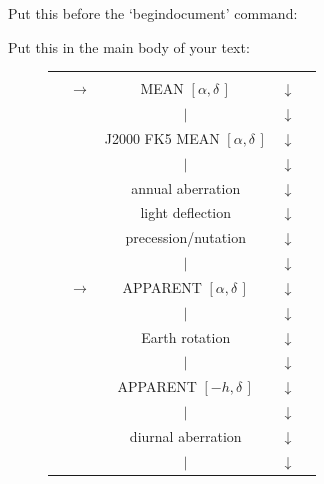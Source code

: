 \documentclass[twoside,11pt]{starlink}
\providecommand{\radec}{$[\alpha,\delta\,]$}
\providecommand{\mhadec}{$[-h,\delta\,]$}
\providecommand{\azel}{$[A,E\,]$}
\begin{document}
\scriptsize
\begin{terminalv}
        Put this before the `begin{document}' command:
\providecommand {\radec}   {$[\alpha,\delta\,]$}
\providecommand {\mhadec}  {$[-h,\delta\,]$}
\providecommand {\azel}    {$[A,E\,]$}

        Put this in the main body of your text:
\begin{figure}
  \begin{small}
    \begin{center}
      \begin{tabular}{|ccccc|}   \hline
        &                 &                                &                & \\
        & $\rightarrow$   &         MEAN \radec            &  $\downarrow$  & \\
        &                 &             $|$                &  $\downarrow$  & \\
        &                 &     J2000 FK5 MEAN \radec      &  $\downarrow$  & \\
        &                 &             $|$                &  $\downarrow$  & \\
        &                 &       annual aberration        &  $\downarrow$  & \\
        &                 &        light deflection        &  $\downarrow$  & \\
        &                 &      precession/nutation       &  $\downarrow$  & \\
        &                 &             $|$                &  $\downarrow$  & \\
        & $\rightarrow$   &         APPARENT \radec        &  $\downarrow$  & \\
        &                 &             $|$                &  $\downarrow$  & \\
        &                 &         Earth rotation         &  $\downarrow$  & \\
        &                 &             $|$                &  $\downarrow$  & \\
        &                 &        APPARENT \mhadec        &  $\downarrow$  & \\
        &                 &             $|$                &  $\downarrow$  & \\
        &                 &       diurnal aberration       &  $\downarrow$  & \\
        &                 &             $|$                &  $\downarrow$  & \\

\end{tabular}
\end{center}
\end{small}
\end{figure}
\end{terminalv}
\end{document}
